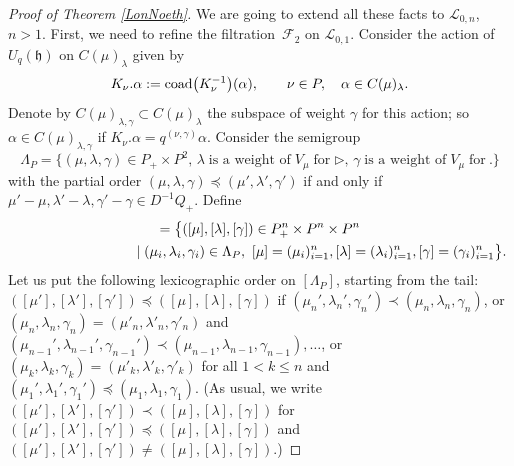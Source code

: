 \documentclass[10pt,a4paper]{amsart}
\numberwithin{equation}{section}
\theoremstyle{definition}
\newcommand{\Ll}{{\mathcal L}}
\begin{document}
\begin{proof}[Proof of Theorem \ref{LonNoeth}]
We are going to extend all these facts to $\Ll_{0,n}$, $n>1$. First, we need to refine the filtration~${\mathcal F}_2$ on $\Ll_{0,1}$. Consider the action of $U_q({\mathfrak h})$ on $C(\mu)_{\lambda}$ given by
\begin{equation}\label{coadweightnew}
K_\nu.\alpha := {\rm coad}\big(K_\nu^{-1}\big)(\alpha),\qquad \nu\in P, \quad \alpha \in C(\mu)_{\lambda}.
\end{equation}
Denote by $C(\mu)_{\lambda,\gamma} \subset C(\mu)_{\lambda}$ the subspace of weight $\gamma$ for
this action; so $\alpha \in C(\mu)_{\lambda,\gamma}$ if $K_\nu.\alpha= q^{(\nu,\gamma)}\alpha$.
Consider the semigroup
\[\Lambda_P=\{(\mu, \lambda,\gamma)\in P_+\times P^2, \, \lambda \;\text{is a weight of}\;V_\mu \;\text{for} \; \rhd ,\, \gamma \;\text{is a weight of}\;V_\mu \;\text{for}\ . \}\]
with the partial order $(\mu,\lambda,\gamma)\preceq (\mu', \lambda',\gamma')$ if and only if $\mu'-\mu,\lambda'-\lambda,\gamma'-\gamma\in D^{-1}Q_+$. Define
\begin{gather*}
[\Lambda_P] =\bigl\lbrace([\mu],[\lambda],[\gamma])\in P_+^n\times P^n\times P^n \\
\hphantom{[\Lambda_P] =\bigl\lbrace([\mu],[\lambda],[\gamma]}{} \mid (\mu_i,\lambda_i,\gamma_i)\in \Lambda_P,\ [\mu] = (\mu_i)_{i=1}^n, [\lambda] = (\lambda_i)_{i=1}^n, [\gamma]=(\gamma_i)_{i=1}^n\bigr\rbrace .
\end{gather*}
Let us put the following lexicographic order on $ [\Lambda_P]$, starting from the tail: $([\mu'],[\lambda'],[\gamma'])\preceq ([\mu], [\lambda],[\gamma])$ if $(\mu_n',\lambda_n',\gamma_n')\prec (\mu_n, \lambda_n,\gamma_n)$, or $(\mu_n,\lambda_n,\gamma_n)= (\mu'_n, \lambda'_n,\gamma'_n)$ and $(\mu_{n-1}',\lambda_{n-1}',\gamma_{n-1}')\prec (\mu_{n-1}, \lambda_{n-1},\gamma_{n-1}),\dots$, or $(\mu_k,\lambda_k,\gamma_k)= (\mu'_k, \lambda'_k,\gamma'_k)$ for all $1< k\leq n$ and $(\mu_1',\lambda_1',\gamma_1')\preceq (\mu_1, \lambda_1,\gamma_1)$. (As usual, we write $([\mu'],[\lambda'],[\gamma'])\prec ([\mu], [\lambda],[\gamma])$ for $([\mu'],[\lambda'],[\gamma'])\preceq ([\mu], [\lambda],[\gamma])$ and $([\mu'],[\lambda'],[\gamma'])\ne ([\mu], [\lambda],[\gamma])$.)


\end{proof}
\end{document}
